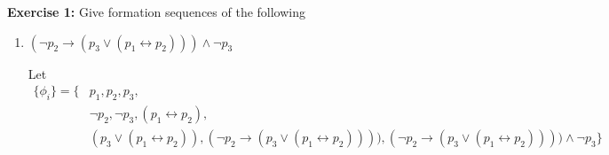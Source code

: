 \textbf{Exercise 1:} Give formation sequences of the following
\begin{enumerate}
    \item $(\neg p_2 \to (p_3 \lor (p_1 \leftrightarrow p_2))) \land \neg p_3$
    \begin{mdframed}
        Let \vspace{-0.7cm}
        \begin{align*}
            \{\phi_i\} = \{&p_1, p_2, p_3, \\ &\neg p_2, \neg p_3, (p_1 \leftrightarrow p_2), \\ &(p_3 \lor (p_1 \leftrightarrow p_2)), (\neg p_2 \rightarrow (p_3 \lor (p_1 \leftrightarrow p_2)))),  (\neg p_2 \rightarrow (p_3 \lor (p_1 \leftrightarrow p_2))))\land \neg p_3\}
        \end{align*}
    \end{mdframed}
\end{enumerate}

